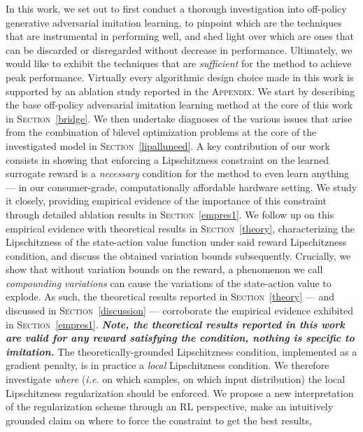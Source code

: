 In this work, we set out to first conduct a thorough investigation into off-policy
generative adversarial imitation learning, to pinpoint which are the techniques
that are instrumental in performing well,
and shed light over which are ones that can be discarded or disregarded
without decrease in performance.
Ultimately, we would like to exhibit the techniques that are \emph{sufficient} for
the method to achieve peak performance.
Virtually every algorithmic design choice made in this work is supported
by an ablation study reported in the \textsc{Appendix}.
We start by describing the base off-policy adversarial imitation learning method
at the core of this work in \textsc{Section}~\ref{bridge}.
We then undertake diagnoses of the various issues that arise from the combination of
bilevel optimization problems at the core of the investigated model
in \textsc{Section}~\ref{lipalluneed}.
A key contribution of our work consists in showing that enforcing a Lipschitzness
constraint on the learned surrogate reward is a \emph{necessary} condition
for the method to even learn anything
--- in our consumer-grade, computationally affordable hardware setting.
We study it closely, providing empirical evidence of the importance of this constraint
through detailed ablation results in \textsc{Section}~\ref{empres1}.
We follow up on this empirical evidence with theoretical results in \textsc{Section}~\ref{theory},
characterizing the
Lipschitzness of the state-action value function under said reward Lipschitzness condition,
and discuss the obtained variation bounds subsequently.
Crucially, we show that without variation bounds on the reward,
a phenomenon we call \emph{compounding variations}
can cause the variations of the state-action value to explode.
As such, the theoretical results reported in \textsc{Section}~\ref{theory}
--- and discussed in \textsc{Section}~\ref{discussion} ---
corroborate the empirical evidence exhibited in \textsc{Section}~\ref{empres1}.
\textbf{\emph{Note, the theoretical results
reported in this work are valid for any reward
satisfying the condition, nothing is specific to imitation.}}
The theoretically-grounded Lipschitzness condition,
implemented as a gradient penalty,
is in practice a \emph{local} Lipschitzness condition.
We therefore investigate \emph{where}
(\textit{i.e.} on which samples, on which input distribution)
the local Lipschitzness regularization should be enforced.
We propose a new interpretation of the regularization scheme
through an RL perspective,
make an intuitively grounded claim on where to force the constraint to get the best results,
